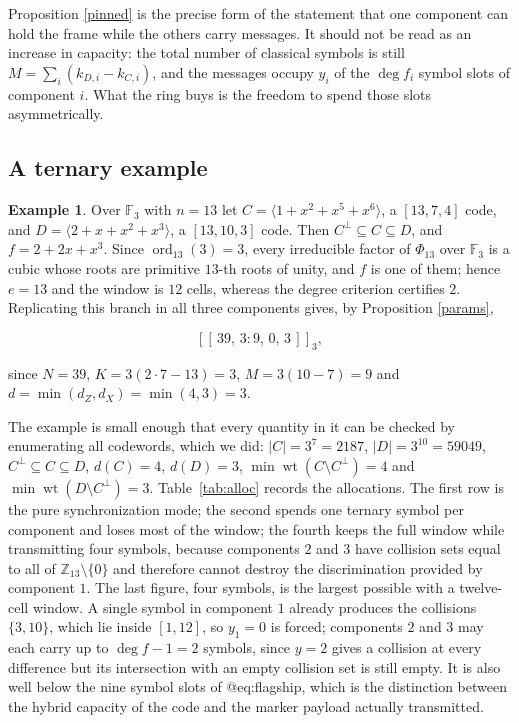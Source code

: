 \documentclass[11pt,reqno]{amsart}
\theoremstyle{definition}
\newtheorem{example}[theorem]{Example}
\theoremstyle{remark}
\newcommand{\F}{\mathbb{F}}
\newcommand{\Z}{\mathbb{Z}}
\newcommand{\wt}{\operatorname{wt}}
\newcommand{\ord}{\operatorname{ord}}
\newcommand{\gen}[1]{\langle #1\rangle}
\begin{document}
Proposition \ref{pinned} is the precise form of the statement that one component can hold the frame while the others carry messages. It should not be read as an increase in capacity: the total number of classical symbols is still $M=\sum_i(k_{D,i}-k_{C,i})$, and the messages occupy $y_i$ of the $\deg f_i$ symbol slots of component $i$. What the ring buys is the freedom to spend those slots asymmetrically.


\subsection{A ternary example}

\begin{example}\label{flagship}
Over $\F_3$ with $n=13$ let $C=\gen{1+x^2+x^5+x^6}$, a $[13,7,4]$ code, and $D=\gen{2+x+x^2+x^3}$, a $[13,10,3]$ code. Then $C^\perp\subseteq C\subseteq D$, and $f=2+2x+x^3$. Since $\ord_{13}(3)=3$, every irreducible factor of $\Phi_{13}$ over $\F_3$ is a cubic whose roots are primitive $13$-th roots of unity, and $f$ is one of them; hence $e=13$ and the window is $12$ cells, whereas the degree criterion certifies $2$. Replicating this branch in all three components gives, by Proposition \ref{params},

\begin{equation}\label{eq:flagship}
[[\,39,\,3:9,\,0,\,3\,]]_3,
\end{equation}

since $N=39$, $K=3(2\cdot7-13)=3$, $M=3(10-7)=9$ and $d=\min(d_Z,d_X)=\min(4,3)=3$.
\end{example}

The example is small enough that every quantity in it can be checked by enumerating all codewords, which we did: $|C|=3^7=2187$, $|D|=3^{10}=59049$, $C^\perp\subseteq C\subseteq D$, $d(C)=4$, $d(D)=3$, $\min\wt(C\setminus C^\perp)=4$ and $\min\wt(D\setminus C^\perp)=3$. Table~\ref{tab:alloc} records the allocations. The first row is the pure synchronization mode; the second spends one ternary symbol per component and loses most of the window; the fourth keeps the full window while transmitting four symbols, because components $2$ and $3$ have collision sets equal to all of $\Z_{13}\setminus\{0\}$ and therefore cannot destroy the discrimination provided by component $1$. The last figure, four symbols, is the largest possible with a twelve-cell window. A single symbol in component $1$ already produces the collisions $\{3,10\}$, which lie inside $[1,12]$, so $y_1=0$ is forced; components $2$ and $3$ may each carry up to $\deg f-1=2$ symbols, since $y=2$ gives a collision at every difference but its intersection with an empty collision set is still empty. It is also well below the nine symbol slots of @eq:flagship, which is the distinction between the hybrid capacity of the code and the marker payload actually transmitted.
\end{document}
